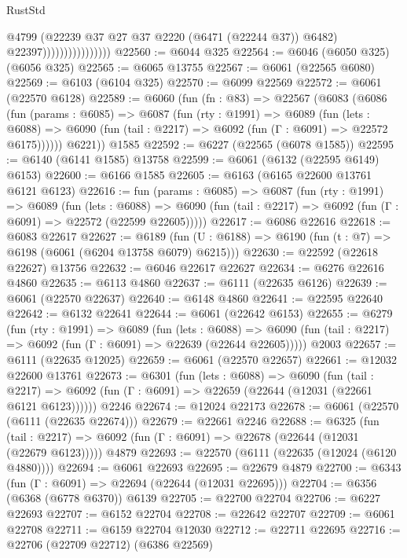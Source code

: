 \begin{lexlean}{RustStd}
\begin{coremodule}
                                    @4799
                                    (@22239 @37 @27 @37 @2220 (@6471 (@22244 @37)) @6482)
                                    @22397))))))))))))))))
@22560 := @6044 @325
@22564 := @6046 (@6050 @325) (@6056 @325)
@22565 := @6065 @13755
@22567 := @6061 (@22565 @6080)
@22569 := @6103 (@6104 @325)
@22570 := @6099 @22569
@22572 := @6061 (@22570 @6128)
@22589 := @6060
    (fun (fn : @83) =>
    @22567
      (@6083
        (@6086
          (fun (params : @6085) =>
          @6087
            (fun (rty : @1991) =>
            @6089
              (fun (lets : @6088) =>
              @6090 (fun (tail : @2217) => @6092 (fun (Γ : @6091) => @22572 @6175))))))
        @6221))
    @1585
@22592 := @6227 (@22565 (@6078 @1585))
@22595 := @6140 (@6141 @1585) @13758
@22599 := @6061 (@6132 (@22595 @6149) @6153)
@22600 := @6166 @1585
@22605 := @6163 (@6165 @22600 @13761 @6121 @6123)
@22616 := fun (params : @6085) =>
  @6087
    (fun (rty : @1991) =>
    @6089
      (fun (lets : @6088) =>
      @6090 (fun (tail : @2217) => @6092 (fun (Γ : @6091) => @22572 (@22599 @22605)))))
@22617 := @6086 @22616
@22618 := @6083 @22617
@22627 := @6189
    (fun (U : @6188) => @6190 (fun (t : @7) => @6198 (@6061 (@6204 @13758 @6079) @6215)))
@22630 := @22592 (@22618 @22627) @13756
@22632 := @6046 @22617 @22627
@22634 := @6276 @22616 @4860
@22635 := @6113 @4860
@22637 := @6111 (@22635 @6126)
@22639 := @6061 (@22570 @22637)
@22640 := @6148 @4860
@22641 := @22595 @22640
@22642 := @6132 @22641
@22644 := @6061 (@22642 @6153)
@22655 := @6279
    (fun (rty : @1991) =>
    @6089
      (fun (lets : @6088) =>
      @6090 (fun (tail : @2217) => @6092 (fun (Γ : @6091) => @22639 (@22644 @22605)))))
    @2003
@22657 := @6111 (@22635 @12025)
@22659 := @6061 (@22570 @22657)
@22661 := @12032 @22600 @13761
@22673 := @6301
    (fun (lets : @6088) =>
    @6090
      (fun (tail : @2217) =>
      @6092 (fun (Γ : @6091) => @22659 (@22644 (@12031 (@22661 @6121 @6123))))))
    @2246
@22674 := @12024 @22173
@22678 := @6061 (@22570 (@6111 (@22635 @22674)))
@22679 := @22661 @2246
@22688 := @6325
    (fun (tail : @2217) => @6092 (fun (Γ : @6091) => @22678 (@22644 (@12031 (@22679 @6123)))))
    @4879
@22693 := @22570 (@6111 (@22635 (@12024 (@6120 @4880))))
@22694 := @6061 @22693
@22695 := @22679 @4879
@22700 := @6343 (fun (Γ : @6091) => @22694 (@22644 (@12031 @22695)))
@22704 := @6356 (@6368 (@6778 @6370)) @6139
@22705 := @22700 @22704
@22706 := @6227 @22693
@22707 := @6152 @22704
@22708 := @22642 @22707
@22709 := @6061 @22708
@22711 := @6159 @22704 @12030
@22712 := @22711 @22695
@22716 := @22706 (@22709 @22712) (@6386 @22569)

\end{coremodule}
\end{lexlean}
